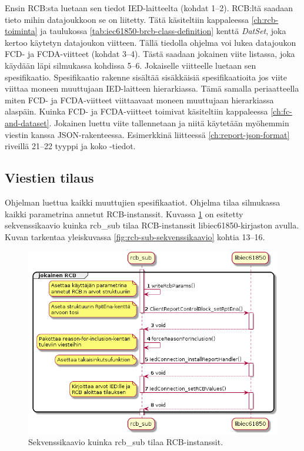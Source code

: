 Ensin RCB:sta luetaan sen tiedot IED-laitteelta (kohdat 1--2). RCB:ltä saadaan tieto mihin datajoukkoon se on liitetty. Tätä käsiteltiin kappaleessa \ref{ch:rcb-toiminta} ja taulukossa \ref{tab:iec61850-brcb-class-definition} kenttä \emph{DatSet}, joka kertoo käytetyn datajoukon viitteen. Tällä tiedolla ohjelma voi lukea datajoukon FCD- ja FCDA-viitteet (kohdat 3--4). Tästä saadaan jokainen viite listassa, joka käydään läpi silmukassa kohdissa 5--6. Jokaiselle viitteelle luetaan sen spesifikaatio. Spesifikaatio rakenne sisältää sisäkkäisiä spesifikaatioita jos viite viittaa moneen muuttujaan IED-laitteen hierarkiassa. Tämä samalla periaatteella miten FCD- ja FCDA-viitteet viittaavaat moneen muuttujaan hierarkiassa alaspäin. Kuinka FCD- ja FCDA-viitteet toimivat käsiteltiin kappaleessa \ref{ch:fc-and-dataset}. Jokainen luettu viite tallennetaan ja niitä käytetään myöhemmin viestin kanssa JSON-rakenteessa. Esimerkkinä liitteessä \ref{ch:report-json-format} riveillä 21--22 tyyppi ja koko -tiedot.


\subsection{Viestien tilaus}
Ohjelman luettua kaikki muuttujien spesifikaatiot. Ohjelma tilaa silmukassa kaikki parametrina annetut RCB-instanssit. Kuvassa \ref{fig:rcb-sub-subscribe-reports} on esitetty sekvenssikaavio kuinka rcb\_sub tilaa RCB-instanssit libiec61850-kirjaston avulla. Kuvan tarkentaa yleiskuvassa \ref{fig:rcb-sub-sekvenssikaavio} kohtia 13--16.

\begin{figure}[ht!]
	\includegraphics[width=1\textwidth]{pictures/rcb-sub-subscribe-reports.png}
	\caption{Sekvenssikaavio kuinka rcb\_sub tilaa RCB-instanssit.}
	\label{fig:rcb-sub-subscribe-reports}
\end{figure}

